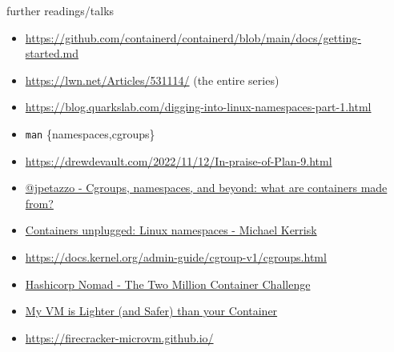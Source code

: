 \documentclass[english]{tumbeamer}
\begin{document}
\begin{frame}{further readings/talks}
\begin{itemize}
    \item \href{https://github.com/containerd/containerd/blob/main/docs/getting-started.md}{https://github.com/containerd/containerd/blob/main/docs/getting-started.md}
    \item \href{https://lwn.net/Articles/531114/}{https://lwn.net/Articles/531114/} (the entire series)
    \item \href{https://blog.quarkslab.com/digging-into-linux-namespaces-part-1.html}{https://blog.quarkslab.com/digging-into-linux-namespaces-part-1.html}
    \item \texttt{man} \{namespaces,cgroups\}
    \item \href{https://drewdevault.com/2022/11/12/In-praise-of-Plan-9.html}{https://drewdevault.com/2022/11/12/In-praise-of-Plan-9.html}
    \item \href{https://www.youtube.com/watch?v=sK5i-N34im8}{@jpetazzo - Cgroups, namespaces, and beyond: what are containers made from?}
    \item \href{https://www.youtube.com/watch?v=0kJPa-1FuoI}{Containers unplugged: Linux namespaces - Michael Kerrisk}
    \item \href{https://docs.kernel.org/admin-guide/cgroup-v1/cgroups.html}{https://docs.kernel.org/admin-guide/cgroup-v1/cgroups.html}
    \item \href{https://www.hashicorp.com/c2m}{Hashicorp Nomad - The Two Million Container Challenge}
    \item \href{https://dl.acm.org/doi/10.1145/3132747.3132763}{My VM is Lighter (and Safer) than your Container}
    \item \href{https://firecracker-microvm.github.io/}{https://firecracker-microvm.github.io/}
\end{itemize}
\end{frame}
\end{document}
